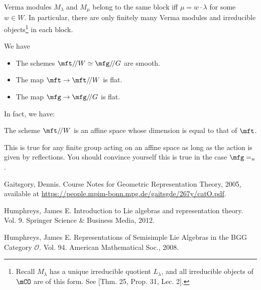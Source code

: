 	\begin{cor}
	Verma modules $M_\lambda$ and $M_\mu$ belong to the same block iff $\mu = w\cdot \lambda$ for some $w\in W$. In particular, there are only finitely many Verma modules and irreducible objects\footnote{Recall $M_\lambda$ has a unique irreducible quotient $L_\lambda$, and all irreducible objects of $\mCO$ are of this form. See [Thm. 25, Prop. 31, Lec. 2].} in each block.
	\end{cor}

	\begin{prop}[{\!\!\cite[Sect. 7]{G}}]
		We have
		\begin{itemize}
			\item[(1)]
				The schemes $ \mft/\!/W \simeq \mfg/\!/G$ are smooth.
			\item[(2)]
				The map $\mft \to  \mft/\!/W$ is flat.
			\item[(3)]
				The map $\mfg \to  \mfg/\!/G$ is flat.
		\end{itemize}
	\end{prop}

	In fact, we have:

	\begin{thm}
		The scheme $ \mft/\!/W $ is an affine space whose dimension is equal to that of $\mft$.
	\end{thm}

	This is true for any finite group acting on an affine space as long as the action is given by reflections. You should convince yourself this is true in the case $\mfg=\sl_n$.


	
\begin{thebibliography}{Yau}

	 Gaitsgory, Dennis. Course Notes for Geometric Representation Theory, 2005, available at \url{https://people.mpim-bonn.mpg.de/gaitsgde/267y/catO.pdf}.

	 Humphreys, James E. Introduction to Lie algebras and representation theory. Vol. 9. Springer Science \& Business Media, 2012.

	 Humphreys, James E. Representations of Semisimple Lie Algebras in the BGG Category $\mathcal{O} $. Vol. 94. American Mathematical Soc., 2008.

\end{thebibliography}

 



